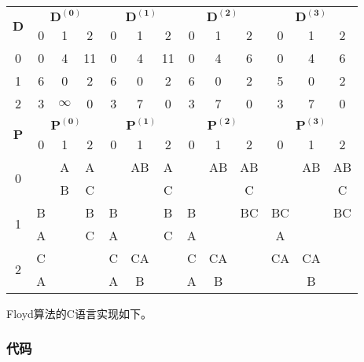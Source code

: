 \begin{center}
\label{tab:floyd}
\begin{tabular}{|c|ccc|ccc|ccc|ccc|}
\hline
\multirow{2}{*}{$\mathbf{D}$} & \multicolumn{3}{|c|}{$\mathbf{D^{(0)}}$} & \multicolumn{3}{|c|}{$\mathbf{D^{(1)}}$} & \multicolumn{3}{|c|}{$\mathbf{D^{(2)}}$} & \multicolumn{3}{|c|}{$\mathbf{D^{(3)}}$} \\
 & 0 & 1 & 2 & 0 & 1 & 2 & 0 & 1 & 2 & 0 & 1 & 2 \\
\hline
0 & 0 & 4 & 11 & 0 & 4 & 11 & 0 & 4 & 6 & 0 & 4 & 6 \\
1 & 6 & 0 & 2 & 6 & 0 & 2 & 6 & 0 & 2 & 5 & 0 & 2 \\
2 & 3 & $\infty$ & 0 & 3 & 7 & 0 & 3 & 7 & 0 & 3 & 7 & 0 \\
\hline
\multirow{2}{*}{$\mathbf{P}$} & \multicolumn{3}{|c|}{$\mathbf{P^{(0)}}$} & \multicolumn{3}{|c|}{$\mathbf{P^{(1)}}$} & \multicolumn{3}{|c|}{$\mathbf{P^{(2)}}$} & \multicolumn{3}{|c|}{$\mathbf{P^{(3)}}$} \\
 & 0 & 1 & 2 & 0 & 1 & 2 & 0 & 1 & 2 & 0 & 1 & 2 \\
\hline
\multirow{2}{*}{0} & & A & A & & AB & A & & AB & AB & & AB & AB \\
                   & & B & C & & & C & & & C & & & C \\
\hline
\multirow{2}{*}{1} & B & & B & B & & B & B & & BC & BC & & BC \\
                   & A & & C & A & & C & A & & & A & & \\
\hline
\multirow{2}{*}{2} & C & & & C & CA & & C & CA & & CA & CA & \\
                   & A & & & A & B & & A & B & & & B & \\
\hline
\end{tabular}
\end{center}

Floyd算法的C语言实现如下。


\subsubsection{代码}

